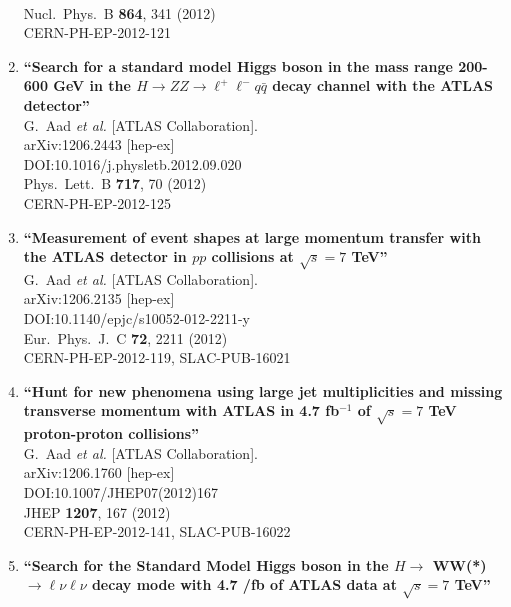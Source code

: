 \documentclass{article}
\begin{document}
\begin{enumerate}
  \\{}Nucl.\ Phys.\ B {\bf 864}, 341 (2012)
  \\{}CERN-PH-EP-2012-121
\item%
{\bf ``Search for a standard model Higgs boson in the mass range 200-600 GeV in the $H \to ZZ \to \ell^+ \ell^- q \bar{q}$ decay channel with the ATLAS detector''}
  \\{}G.~Aad {\it et al.} [ATLAS Collaboration].
  \\{}arXiv:1206.2443 [hep-ex]
  \\{}DOI:10.1016/j.physletb.2012.09.020
  \\{}Phys.\ Lett.\ B {\bf 717}, 70 (2012)
  \\{}CERN-PH-EP-2012-125
\item%
{\bf ``Measurement of event shapes at large momentum transfer with the ATLAS detector in $pp$ collisions at $\sqrt{s}=7$ TeV''}
  \\{}G.~Aad {\it et al.} [ATLAS Collaboration].
  \\{}arXiv:1206.2135 [hep-ex]
  \\{}DOI:10.1140/epjc/s10052-012-2211-y
  \\{}Eur.\ Phys.\ J.\ C {\bf 72}, 2211 (2012)
  \\{}CERN-PH-EP-2012-119, SLAC-PUB-16021
\item%
{\bf ``Hunt for new phenomena using large jet multiplicities and missing transverse momentum with ATLAS in 4.7 fb$^{-1}$ of $\sqrt{s}=7$ TeV proton-proton collisions''}
  \\{}G.~Aad {\it et al.} [ATLAS Collaboration].
  \\{}arXiv:1206.1760 [hep-ex]
  \\{}DOI:10.1007/JHEP07(2012)167
  \\{}JHEP {\bf 1207}, 167 (2012)
  \\{}CERN-PH-EP-2012-141, SLAC-PUB-16022
\item%
{\bf ``Search for the Standard Model Higgs boson in the $H \to$ WW(*) $\to \ell \nu \ell \nu$ decay mode with 4.7 /fb of ATLAS data at $\sqrt{s}=7$ TeV''}

\end{enumerate}
\end{document}
